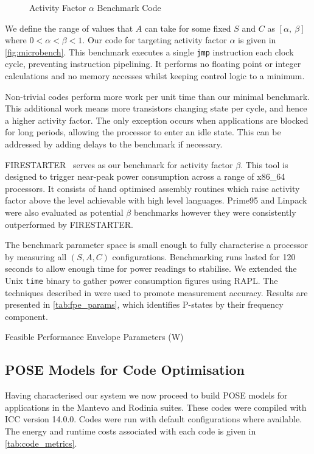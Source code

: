 \begin{figure}[ht]
\centering
\lstset{basicstyle=\ttfamily\footnotesize\bfseries, frame=tb} %

\caption{Activity Factor $\alpha$ Benchmark Code}
\label{fig:microbench}
\end{figure}

We define the range of values that $A$ can take for some fixed $S$ and $C$ as $[\alpha,~\beta]$ where $0 < \alpha < \beta < 1$.
Our code for targeting activity factor $\alpha$ is given in \autoref{fig:microbench}.
This benchmark executes a single \texttt{jmp} instruction each clock cycle, preventing instruction pipelining.
It performs no floating point or integer calculations and no memory accesses whilst keeping control logic to a minimum.

Non-trivial codes perform more work per unit time than our minimal benchmark.
This additional work means more transistors changing state per cycle, and hence a higher activity factor.
The only exception occurs when applications are blocked for long periods, allowing the processor to enter an idle state.
This can be addressed by adding delays to the benchmark if necessary.

FIRESTARTER~\cite{hackenberg:2013ab} serves as our benchmark for activity factor $\beta$.
This tool is designed to trigger near-peak power consumption across a range of x86\_64 processors.
It consists of hand optimised assembly routines which raise activity factor above the level achievable with high level languages.
Prime95 and Linpack were also evaluated as potential $\beta$ benchmarks however they were consistently outperformed by FIRESTARTER.

The benchmark parameter space is small enough to fully characterise a processor by measuring all $(S,A,C)$ configurations.
Benchmarking runs lasted for 120 seconds to allow enough time for power readings to stabilise.
We extended the Unix \texttt{time} binary to gather power consumption figures using RAPL.
The techniques described in \cite{hahnel:2012aa} were used to promote measurement accuracy.
Results are presented in \autoref{tab:fpe_params}, which identifies P-states by their frequency component.

\begin{table}
\centering
\caption{Feasible Performance Envelope Parameters (W)}
\label{tab:fpe_params}

\end{table}

\subsection{POSE Models for Code Optimisation}
Having characterised our system we now proceed to build POSE models for applications in the Mantevo and Rodinia suites.
These codes were compiled with ICC version 14.0.0.
Codes were run with default configurations where available.
The energy and runtime costs associated with each code is given in \autoref{tab:code_metrics}.

